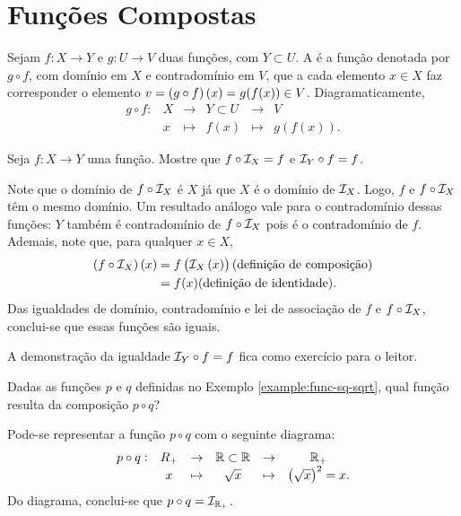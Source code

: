 \section{Funções Compostas}

\begin{definition}
Sejam $f: X \to Y$ e $g: U \to V$ duas funções, com $Y \subset U$. A  é a função denotada por $g \circ f$, com domínio em $X$ e contradomínio em $V$, que a cada elemento $x \in X$ faz corresponder o elemento $v = \left(g \circ f\right)(x) = g(f(x)) \in V$. Diagramaticamente,
%
\begin{equation*}
\begin{array}{cccccc}
g \circ f : & X & \to     & Y \subset U & \to & V \\
     &  x & \mapsto & f(x) & \mapsto & g(f(x)).
\end{array}
\end{equation*}
\end{definition}

\begin{example}
Seja $f: X \to Y$ uma função. Mostre que $f \circ \mathcal I_X = f$ e $\mathcal I_Y \circ f = f$.
\end{example}

\begin{solution}
Note que o domínio de $f \circ \mathcal I_X$ é $X$ já que $X$ é o domínio de $\mathcal I_X$. Logo, $f$ e $f \circ \mathcal I_X$ têm o mesmo domínio. Um resultado análogo vale para o contradomínio dessas funções:  $Y$ também é contradomínio de $f \circ \mathcal I_X$ pois é o contradomínio de $f$. Ademais, note que, para qualquer $x \in X$, 
%
\begin{align*}
(f \circ \mathcal I_X)\left(x\right) &= f\left(\mathcal I_X \left(x\right)\right) \text{(definição de composição)} \\ &= f(x) \text{(definição de identidade)}.
\end{align*}
% 
Das igualdades de domínio, contradomínio e lei de associação de $f$ e $f \circ \mathcal I_X$, conclui-se que essas funções são iguais.

A demonstração da igualdade $\mathcal I_Y \circ f = f$ fica como exercício para o leitor.
\end{solution}

\begin{example}
Dadas as funções $p$ e $q$ definidas no Exemplo \ref{example:func-sq-sqrt}, qual função resulta da composição $p \circ q$?
\end{example}

\begin{solution}
Pode-se representar a função $p \circ q$ com o seguinte diagrama:
%
\begin{equation*}
\begin{array}{cccccc}
p \circ q : & R_+ & \to     & \mathbb{R} \subset \mathbb{R} & \to     & \mathbb{R}_+ \\
            &  x  & \mapsto & \sqrt x       & \mapsto & \left(\sqrt x\right)^2 = x.
\end{array}
\end{equation*}
%
Do diagrama, conclui-se que $p \circ q = \mathcal I_{\mathbb{R}_+}$.
\end{solution}

